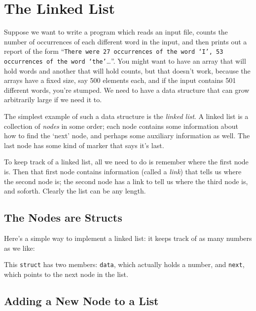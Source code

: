 \section{The Linked List}

Suppose we want to write a program which reads an input file, counts the
number of occurrences of each different word in the input, and then
prints out a report of the form ``{\tt There were 27 occurrences of the
word `I', 53 occurrences of the word `the'}\ldots''. You might want to
have an array that will hold words and another that will hold counts,
but that doesn't work, because the arrays have a fixed size, say 500
elements each, and if the input contains 501 different words, you're
stumped.  We need to have a data structure that can grow arbitrarily
large if we need it to. 

The simplest example of such a data structure is the {\em linked
list}\/.  A linked list is a collection of {\em nodes} in some order;
each node contains some information about how to find the `next' node,
and perhaps some auxiliary information as well.  The last node has some
kind of marker that says it's last.

To keep track of a linked list, all we need to do is remember where the
first node is.  Then that first node contains information (called a {\em
link}\/) that tells us where the second node is; the second node has a
link to tell us where the third node is, and soforth. Clearly the list
can be any length.

\subsection{The Nodes are Structs}

Here's a simple way to implement a linked list: it keeps track of as
many numbers as we like:

\begin{flushleft}
\verb% struct listnode {% \\*
\verb%   int data; % \\*
\verb%   struct listnode *next; % \\*
\verb%} ; % 
\end{flushleft}

This {\tt struct} has two members:  {\tt data}, which actually holds a
number, and {\tt next}, which points to the next node in the list.  

\subsection{Adding a New Node to a List}

